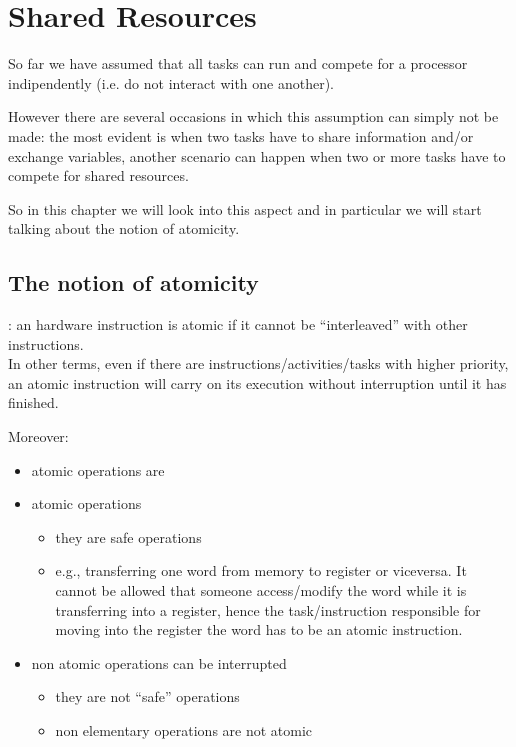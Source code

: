 \chapter{Shared Resources}
So far we have assumed that all tasks can run and compete for a processor indipendently (i.e. do not interact with one another).

However there are several occasions in which this assumption can simply not be made: the most evident is when two tasks have to share information and/or exchange variables, another scenario can happen when two or more tasks have to compete for shared resources.

So in this chapter we will look into this aspect and in particular we will start talking about the notion of atomicity.

\section{The notion of atomicity}
: an hardware instruction is atomic if it cannot be ``interleaved'' with other instructions. \\
In other terms, even if there are instructions/activities/tasks with higher priority, an atomic instruction will carry on its execution without interruption until it has finished.

Moreover:
\begin{itemize}
\item atomic operations are 
\item atomic operations 
\begin{itemize}
\item they are safe operations
\item e.g., transferring one word from memory to register or viceversa. It cannot be allowed that someone access/modify the word while it is transferring into a register, hence the task/instruction responsible for moving into the register the word has to be an atomic instruction.
\end{itemize}
\item non atomic operations can be interrupted
\begin{itemize}
\item they are not ``safe'' operations
\item non elementary operations are not atomic
\end{itemize}
\end{itemize}

